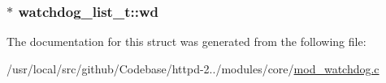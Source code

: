 \subsubsection[{\texorpdfstring{wd}{wd}}]{$\ast$ watchdog\+\_\+list\+\_\+t\+::wd}\hypertarget{structwatchdog__list__t_a15af0660656a49ca76bc5113fe3b5162}{}\label{structwatchdog__list__t_a15af0660656a49ca76bc5113fe3b5162}


The documentation for this struct was generated from the following file\+:\begin{DoxyCompactItemize}
\item 
/usr/local/src/github/\+Codebase/httpd-\/2../modules/core/\hyperlink{mod__watchdog_8c}{mod\+\_\+watchdog.\+c}\end{DoxyCompactItemize}
